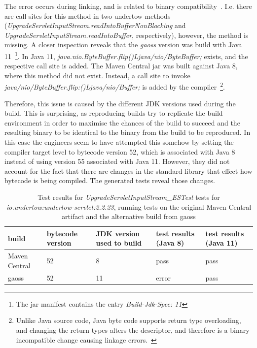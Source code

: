 \documentclass[conference]{IEEEtran}
\begin{document}
The error occurs during linking, and is related to binary compatibility~\cite{JVM17Spec}. I.e. there are call sites for this method in two undertow methods (\textit{UpgradeServletInputStream.readIntoBufferNonBlocking} and \textit{UpgradeServletInputStream.readIntoBuffer}, respectively), however, the method is missing. 
A closer inspection reveals that the \textit{gaoss} version was build with Java 11~\footnote{The jar manifest contains the entry \textit{Build-Jdk-Spec: 11}}. In Java 11, \textit{java.nio.ByteBuffer.flip()Ljava/nio/ByteBuffer;} exists, and the respective call site is added. The Maven Central jar was built against Java 8, where this method did not exist.  Instead, a call site to invoke \textit{java/nio/ByteBuffer.flip:()Ljava/nio/Buffer;} is added by the compiler~\footnote{Unlike Java source code, Java byte code supports return type overloading, and changing the return types alters the descriptor, and therefore is a binary incompatible change causing linkage errors.~\cite{JVM17Spec,dietrich2014broken}}.

Therefore, this issue is caused by the different JDK versions used during the build. This is surprising, as reproducing builds try to replicate the build environment in order to maximise the chances of the build to succeed and the resulting binary to be identical to the binary from the build to be reproduced. In this case the engineers seem to have attempted this somehow by setting the compiler target level to bytecode version 52, which is associated with Java 8~\cite[Sect. 4.1]{JVM17Spec} instead of using version 55 associated with Java 11.  However, they did not account for the fact that there are changes in the standard library that effect how bytecode is being compiled. The generated tests reveal those changes. 



\begin{table}[]
	\begin{tabular}{|p{1.8cm}p{0.9cm}p{1.5cm}p{1.2cm}p{1.2cm}|}
		\hline
		build         & bytecode version & JDK version used to build & test results (Java 8)                                                    & test results (Java 11) \\ \hline 
		Maven Central & 52               & 8                         & pass                                                                     & pass                   \\
		gaoss         & 52               & 11                        & error & pass                  \\ \hline
	\end{tabular}
	\caption{Test results for \textit{UpgradeServletInputStream\_ESTest} tests for  \textit{io.undertow:undertow-servlet:2.2.23}, running tests on the original Maven Central artifact and the alternative build from gaoss}
\end{table}
\end{document}
